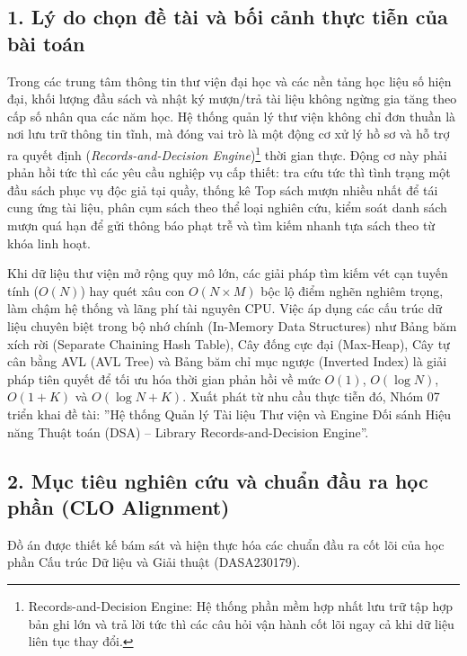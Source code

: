 \documentclass[14pt,a4paper]{extarticle}
\begin{document}
\subsection*{1. Lý do chọn đề tài và bối cảnh thực tiễn của bài toán}

Trong các trung tâm thông tin thư viện đại học và các nền tảng học liệu số hiện đại, khối lượng đầu sách và nhật ký mượn/trả tài liệu không ngừng gia tăng theo cấp số nhân qua các năm học. Hệ thống quản lý thư viện không chỉ đơn thuần là nơi lưu trữ thông tin tĩnh, mà đóng vai trò là một động cơ xử lý hồ sơ và hỗ trợ ra quyết định (\textit{Records-and-Decision Engine})\footnote{Records-and-Decision Engine: Hệ thống phần mềm hợp nhất lưu trữ tập hợp bản ghi lớn và trả lời tức thì các câu hỏi vận hành cốt lõi ngay cả khi dữ liệu liên tục thay đổi.} thời gian thực. Động cơ này phải phản hồi tức thì các yêu cầu nghiệp vụ cấp thiết: tra cứu tức thì tình trạng một đầu sách phục vụ độc giả tại quầy, thống kê Top sách mượn nhiều nhất để tái cung ứng tài liệu, phân cụm sách theo thể loại nghiên cứu, kiểm soát danh sách mượn quá hạn để gửi thông báo phạt trễ và tìm kiếm nhanh tựa sách theo từ khóa linh hoạt.

Khi dữ liệu thư viện mở rộng quy mô lớn, các giải pháp tìm kiếm vét cạn tuyến tính ($O(N)$) hay quét xâu con $O(N \times M)$ bộc lộ điểm nghẽn nghiêm trọng, làm chậm hệ thống và lãng phí tài nguyên CPU. Việc áp dụng các cấu trúc dữ liệu chuyên biệt trong bộ nhớ chính (In-Memory Data Structures) như Bảng băm xích rời (Separate Chaining Hash Table), Cây đống cực đại (Max-Heap), Cây tự cân bằng AVL (AVL Tree) và Bảng băm chỉ mục ngược (Inverted Index) là giải pháp tiên quyết để tối ưu hóa thời gian phản hồi về mức $O(1)$, $O(\log N)$, $O(1+K)$ và $O(\log N + K)$. Xuất phát từ nhu cầu thực tiễn đó, Nhóm 07 triển khai đề tài: ''Hệ thống Quản lý Tài liệu Thư viện và Engine Đối sánh Hiệu năng Thuật toán (DSA) -- Library Records-and-Decision Engine''.

\subsection*{2. Mục tiêu nghiên cứu và chuẩn đầu ra học phần (CLO Alignment)}

Đồ án được thiết kế bám sát và hiện thực hóa các chuẩn đầu ra cốt lõi của học phần Cấu trúc Dữ liệu và Giải thuật (DASA230179).
\end{document}
